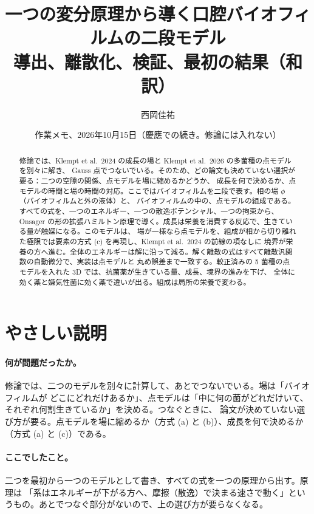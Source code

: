 \documentclass[11pt,a4paper]{article}
\title{\bfseries 一つの変分原理から導く口腔バイオフィルムの二段モデル\\[2pt]
\large 導出、離散化、検証、最初の結果（和訳）}
\author{西岡佳祐}
\date{作業メモ、2026年10月15日（慶應での続き。修論には入れない）}
\theoremstyle{definition}
\begin{document}
\maketitle

\begin{abstract}
\noindent 修論では、Klempt et al.\ 2024 の成長の場と Klempt et al.\ 2026 の多菌種の点モデルを別々に解き、
Gauss 点でつないでいる。そのため、どの論文も決めていない選択が要る：二つの空隙の関係、点モデルを場に縮めるかどうか、
成長を何で決めるか、点モデルの時間と場の時間の対応。ここではバイオフィルムを二段で表す。相の場 $\phi$（バイオフィルムと外の液体）と、
バイオフィルムの中の、点モデルの組成である。すべての式を、一つのエネルギー、一つの散逸ポテンシャル、一つの拘束から、
Onsager の形の拡張ハミルトン原理で導く。成長は栄養を消費する反応で、生きている量が触媒になる。このモデルは、
場が一様なら点モデルを、組成が相から切り離れた極限では要素の方式 (c) を再現し、Klempt et al.\ 2024 の前線の項なしに
境界が栄養の方へ進む。全体のエネルギーは解に沿って減る。解く離散の式はすべて離散汎関数の自動微分で、実装は点モデルと
丸め誤差まで一致する。較正済みの 5 菌種の点モデルを入れた 3D では、抗菌薬が生きている量、成長、境界の進みを下げ、
全体に効く薬と嫌気性菌に効く薬で違いが出る。組成は局所の栄養で変わる。
\end{abstract}

\section*{やさしい説明}

\paragraph{何が問題だったか。} 修論では、二つのモデルを別々に計算して、あとでつないでいる。場は「バイオフィルムが
どこにどれだけあるか」、点モデルは「中に何の菌がどれだけいて、それぞれ何割生きているか」を決める。つなぐときに、
論文が決めていない選び方が要る。点モデルを場に縮めるか（方式 (a) と (b)）、成長を何で決めるか（方式 (a) と (c)）である。

\paragraph{ここでしたこと。} 二つを最初から一つのモデルとして書き、すべての式を一つの原理から出す。原理は
「系はエネルギーが下がる方へ、摩擦（散逸）で決まる速さで動く」というもの。あとでつなぐ部分がないので、上の選び方が要らなくなる。
\end{document}
